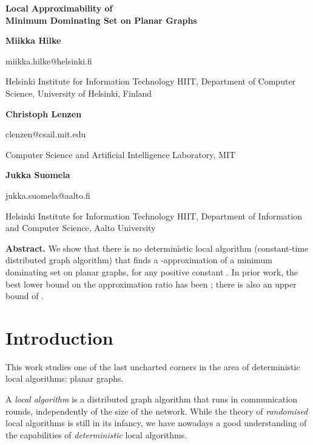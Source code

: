 \documentclass[11pt,a4paper]{article}
\theoremstyle{definition}
\begin{document}
\begin{flushleft}
{\Large\bfseries Local Approximability of \\ Minimum Dominating Set on Planar Graphs\par}
\bigskip
\bigskip

\textbf{Miikka Hilke}

{\sffamily\small miikka.hilke@helsinki.fi}

{\footnotesize
Helsinki Institute for Information Technology HIIT,
Department of Computer Science, University of Helsinki, Finland\par}

\medskip
\textbf{Christoph Lenzen}

{\sffamily\small clenzen@csail.mit.edu}

{\footnotesize
Computer Science and Artificial Intelligence Laboratory, MIT\par}

\medskip
\textbf{Jukka Suomela}

{\sffamily\small jukka.suomela@aalto.fi}

{\footnotesize
Helsinki Institute for Information Technology HIIT,
Department of Information and Computer Science, Aalto University\par}
\end{flushleft}

\bigskip
\noindent\textbf{Abstract.}
We show that there is no deterministic local algorithm (constant-time distributed graph algorithm) that finds a -approximation of a minimum dominating set on planar graphs, for any positive constant . In prior work, the best lower bound on the approximation ratio has been ; there is also an upper bound of .

\medskip


\section{Introduction}

This work studies one of the last uncharted corners in the area of deterministic local algorithms: planar graphs.

A \emph{local algorithm} is a distributed graph algorithm that runs in  communication rounds, independently of the size of the network. While the theory of \emph{randomised} local algorithms is still in its infancy, we have nowadays a good understanding of the capabilities of \emph{deterministic} local algorithms.
\end{document}
